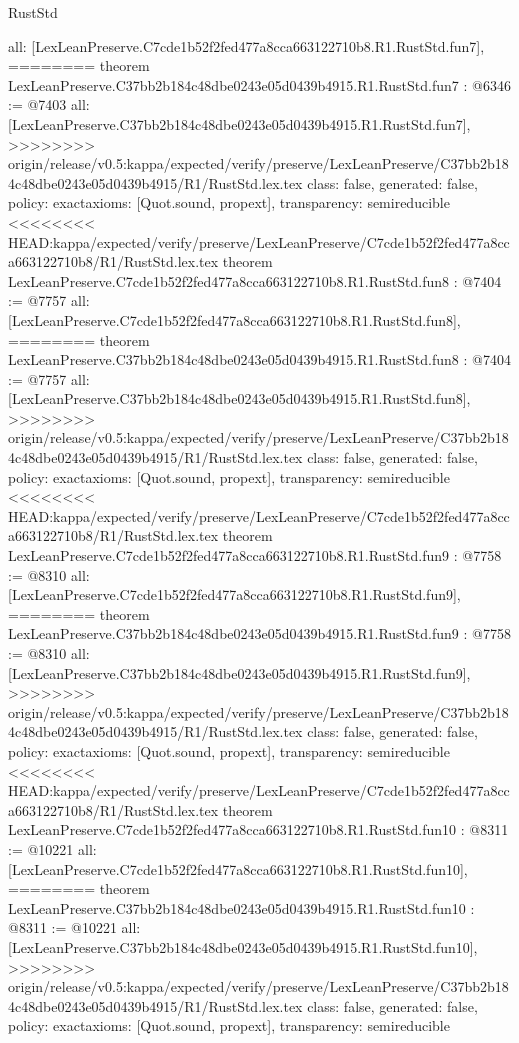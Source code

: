 \begin{lexlean}{RustStd}
\begin{coremodule}
{\begin{coremodule}
{{{{{{{{{{  all: [LexLeanPreserve.C7cde1b52f2fed477a8cca663122710b8.R1.RustStd.fun7],
========
theorem LexLeanPreserve.C37bb2b184c48dbe0243e05d0439b4915.R1.RustStd.fun7 : @6346 := @7403 {
  all: [LexLeanPreserve.C37bb2b184c48dbe0243e05d0439b4915.R1.RustStd.fun7],
>>>>>>>> origin/release/v0.5:kappa/expected/verify/preserve/LexLeanPreserve/C37bb2b184c48dbe0243e05d0439b4915/R1/RustStd.lex.tex
  class: false,
  generated: false,
  policy: exact{axioms: [Quot.sound, propext]},
  transparency: semireducible
}
<<<<<<<< HEAD:kappa/expected/verify/preserve/LexLeanPreserve/C7cde1b52f2fed477a8cca663122710b8/R1/RustStd.lex.tex
theorem LexLeanPreserve.C7cde1b52f2fed477a8cca663122710b8.R1.RustStd.fun8 : @7404 := @7757 {
  all: [LexLeanPreserve.C7cde1b52f2fed477a8cca663122710b8.R1.RustStd.fun8],
========
theorem LexLeanPreserve.C37bb2b184c48dbe0243e05d0439b4915.R1.RustStd.fun8 : @7404 := @7757 {
  all: [LexLeanPreserve.C37bb2b184c48dbe0243e05d0439b4915.R1.RustStd.fun8],
>>>>>>>> origin/release/v0.5:kappa/expected/verify/preserve/LexLeanPreserve/C37bb2b184c48dbe0243e05d0439b4915/R1/RustStd.lex.tex
  class: false,
  generated: false,
  policy: exact{axioms: [Quot.sound, propext]},
  transparency: semireducible
}
<<<<<<<< HEAD:kappa/expected/verify/preserve/LexLeanPreserve/C7cde1b52f2fed477a8cca663122710b8/R1/RustStd.lex.tex
theorem LexLeanPreserve.C7cde1b52f2fed477a8cca663122710b8.R1.RustStd.fun9 : @7758 := @8310 {
  all: [LexLeanPreserve.C7cde1b52f2fed477a8cca663122710b8.R1.RustStd.fun9],
========
theorem LexLeanPreserve.C37bb2b184c48dbe0243e05d0439b4915.R1.RustStd.fun9 : @7758 := @8310 {
  all: [LexLeanPreserve.C37bb2b184c48dbe0243e05d0439b4915.R1.RustStd.fun9],
>>>>>>>> origin/release/v0.5:kappa/expected/verify/preserve/LexLeanPreserve/C37bb2b184c48dbe0243e05d0439b4915/R1/RustStd.lex.tex
  class: false,
  generated: false,
  policy: exact{axioms: [Quot.sound, propext]},
  transparency: semireducible
}
<<<<<<<< HEAD:kappa/expected/verify/preserve/LexLeanPreserve/C7cde1b52f2fed477a8cca663122710b8/R1/RustStd.lex.tex
theorem LexLeanPreserve.C7cde1b52f2fed477a8cca663122710b8.R1.RustStd.fun10 : @8311 := @10221 {
  all: [LexLeanPreserve.C7cde1b52f2fed477a8cca663122710b8.R1.RustStd.fun10],
========
theorem LexLeanPreserve.C37bb2b184c48dbe0243e05d0439b4915.R1.RustStd.fun10 : @8311 := @10221 {
  all: [LexLeanPreserve.C37bb2b184c48dbe0243e05d0439b4915.R1.RustStd.fun10],
>>>>>>>> origin/release/v0.5:kappa/expected/verify/preserve/LexLeanPreserve/C37bb2b184c48dbe0243e05d0439b4915/R1/RustStd.lex.tex
  class: false,
  generated: false,
  policy: exact{axioms: [Quot.sound, propext]},
  transparency: semireducible
}}}}}}}}}}}}}}
\end{coremodule}}
\end{coremodule}
\end{lexlean}
